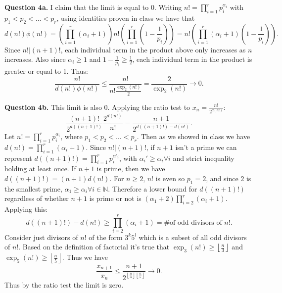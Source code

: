 \documentclass[letterpaper, reqno,11pt]{article}
\begin{document}
{\medskip\noindent\bf Question 4a.} I claim that the limit is equal to 0. Writing $n!=\prod_{i=1}^{r}p_i^{\alpha_i}$ with $p_1<p_2<\ldots<p_r$, using identities proven in class we have that
\[
d(n!)\phi(n!)=\left(\prod_{i=1}^{r}(\alpha_i+1)\right)n!\left(\prod_{i=1}^{r}\left(1-\frac{1}{p_i}\right)\right)=n!\left( \prod_{i=1}^{r}(\alpha_i+1)\left( 1-\frac{1}{p_i} \right)  \right) 
.\]
Since $n!|(n+1)!$, each individual term in the product above only increases as $n$ increases. Also since $\alpha_i\geq 1$ and $1-\frac{1}{p_i}\geq \frac{1}{2}$, each individual term in the product is greater or equal to 1. Thus:
\[
    \frac{n!}{d(n!)\phi(n!)}\leq \frac{n!}{n! \frac{\exp_2(n!)}{2}}=\frac{2}{\exp_2(n!)} \to 0
.\]

{\medskip\noindent\bf Question 4b.} This limit is also 0. Applying the ratio test to $x_n= \frac{n!}{2^{d(n!)}}$:
\[
\frac{(n+1)!}{2^{d((n+1)!)}} \frac{2^{d(n!)}}{n!}= \frac{n+1}{2^{d((n+1)!)-d(n!)}}
.\]
Let $n!=\prod_{i=1}^{r}p_i^{\alpha_i}$, where $p_1<p_2<\ldots<p_r$. Then as we showed in class we have $d(n!)=\prod_{i=1}^{r}(\alpha_i+1)$. Since $n!|(n+1)!$, if $n+1$ isn't a prime we can represent $d((n+1)!)=\prod_{i=1}^{r}p_i^{\alpha'_i}$, with $\alpha_i'\geq\alpha_i\forall i$ and strict inequality holding at least once. If $n+1$ is prime, then we have $d((n+1)!)=(n+1)d(n!)$. For $n\geq 2$, $n!$ is even so $p_1=2$, and since $2$ is the smallest prime, $\alpha_1\geq \alpha_i\forall i\in \mathbb{N}$. Therefore a lower bound for $d((n+1)!)$ regardless of whether $n+1$ is prime or not is $(\alpha_1+2)\prod_{i=2}^{r}(\alpha_i+1)$. Applying this:
\[
d((n+1)!)-d(n!)\geq \prod_{i=2}^{r}(\alpha_i+1)=\text{\# of odd divisors of $n!$}
.\]
Consider just divisors of $n!$ of the form $3^{k}5^{l}$ which is a subset of all odd divisors of $n!$. Based on the definition of factorial it's true that $\exp_3(n!)\geq \left\lfloor \frac{n}{3} \right\rfloor$ and $\exp_5(n!)\geq \left\lfloor \frac{n}{5} \right\rfloor$. Thus we have
\[
    \frac{x_{n+1}}{x_{n}}\leq \frac{n+1}{2^{\left\lfloor \frac{n}{3} \right\rfloor\left\lfloor \frac{n}{5} \right\rfloor}}\to 0
.\]
Thus by the ratio test the limit is zero.
\end{document}
